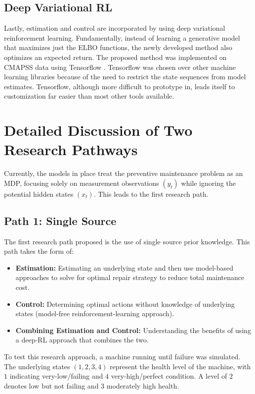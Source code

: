 \documentclass[english]{article}
\numberwithin{equation}{section}
\begin{document}
	\subsection*{Deep Variational RL}
	Lastly, estimation and control are incorporated by using deep variational reinforcement learning. Fundamentally, instead of learning a generative model that maximizes just the ELBO functions, the newly developed method also optimizes an expected return. The proposed method was implemented on CMAPSS data using Tensorflow \cite{tensor}.  Tensorflow was chosen over other machine learning libraries because of the need to restrict the state sequences from model estimates. Tensorflow, although more difficult to prototype in, leads itself to customization far easier than most other tools available.
	 
	\section*{Detailed Discussion of Two Research Pathways}
	Currently, the models in place treat the preventive maintenance problem as an MDP, focusing solely on measurement observations $(y_t)$ while ignoring the potential hidden states $(x_t)$. This leads to the first research path.
	
	\subsection*{Path 1: Single Source}
	The first research path proposed is the use of single source prior knowledge.  This path takes the form of:
	
	\begin{itemize}
		\item \textbf{Estimation:} Estimating an underlying state and then use model-based approaches to solve for optimal repair strategy to reduce total maintenance cost.
		\item \textbf{Control:} Determining optimal actions without knowledge of underlying states (model-free reinforcement-learning approach).
		\item \textbf{Combining Estimation and Control:} Understanding the benefits of using a deep-RL approach that combines the two.
	\end{itemize}
	
	
	To test this research approach, a machine running until failure was simulated. The underlying states $(1,2,3,4)$ represent the health level of the machine, with $1$ indicating very-low/failing and $4$ very-high/perfect condition. A level of $2$ denotes low but not failing and $3$ moderately high health.
	
\end{document}
